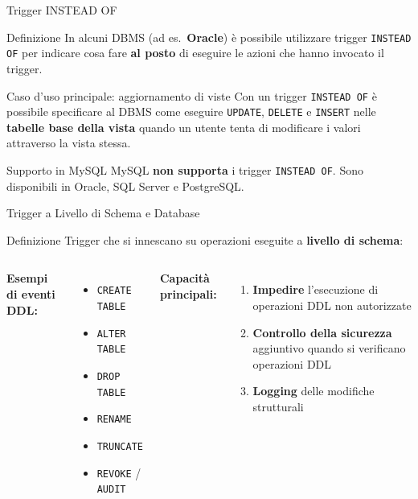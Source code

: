 \documentclass[aspectratio=169]{beamer}
\begin{document}
\begin{frame}{Trigger INSTEAD OF}
  \begin{block}{Definizione}
    In alcuni DBMS (ad es.\ \textbf{Oracle}) è possibile utilizzare trigger
    \texttt{INSTEAD OF} per indicare cosa fare \textbf{al posto} di eseguire
    le azioni che hanno invocato il trigger.
  \end{block}
  \vspace{0.3cm}
  \begin{exampleblock}{Caso d'uso principale: aggiornamento di viste}
    Con un trigger \texttt{INSTEAD OF} è possibile specificare al DBMS come
    eseguire \texttt{UPDATE}, \texttt{DELETE} e \texttt{INSERT} nelle
    \textbf{tabelle base della vista} quando un utente tenta di modificare
    i valori attraverso la vista stessa.
  \end{exampleblock}
  \vspace{0.2cm}
  \begin{alertblock}{Supporto in MySQL}
    MySQL \textbf{non supporta} i trigger \texttt{INSTEAD OF}.
    Sono disponibili in Oracle, SQL Server e PostgreSQL.
  \end{alertblock}
\end{frame}

\begin{frame}{Trigger a Livello di Schema e Database}
  \begin{block}{Definizione}
    Trigger che si innescano su operazioni eseguite a \textbf{livello di schema}:
  \end{block}
  \vspace{0.2cm}
  \begin{columns}[T]
      \textbf{Esempi di eventi DDL:}
      \begin{itemize}
        \item \texttt{CREATE TABLE}
        \item \texttt{ALTER TABLE}
        \item \texttt{DROP TABLE}
        \item \texttt{RENAME}
        \item \texttt{TRUNCATE}
        \item \texttt{REVOKE} / \texttt{AUDIT}
      \end{itemize}
      \textbf{Capacità principali:}
      \begin{enumerate}
        \item \textbf{Impedire} l'esecuzione di operazioni DDL non autorizzate
        \item \textbf{Controllo della sicurezza} aggiuntivo quando si verificano operazioni DDL
        \item \textbf{Logging} delle modifiche strutturali
      \end{enumerate}
  \end{columns}
\end{frame}
\end{document}
